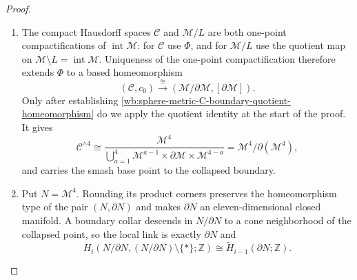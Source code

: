 \begin{proof}
\begin{enumerate}[label=\arabic*.,leftmargin=*]
\item The compact Hausdorff spaces \(\mathcal C\) and
\(\mathcal M/L\) are both one-point compactifications of
\(\operatorname{int}\mathcal M\): for \(\mathcal C\) use \(\Phi\), and for
\(\mathcal M/L\) use the quotient map on
\(\mathcal M\setminus L=\operatorname{int}\mathcal M\).  Uniqueness of the
one-point compactification therefore extends \(\Phi\) to a based
homeomorphism
\begin{equation}
 (\mathcal C,c_0)
 \xrightarrow{\ \cong\ }
 (\mathcal M/\partial\mathcal M,[\partial\mathcal M]).
 \label{wb:sphere-metric-C-boundary-quotient-homeomorphism}
\end{equation}
Only after establishing
\eqref{wb:sphere-metric-C-boundary-quotient-homeomorphism} do we apply the
quotient identity at the start of the proof.  It gives
\[
 \mathcal C^{\wedge4}
 \cong
 \frac{\mathcal M^4}
 {\displaystyle\bigcup_{a=1}^4
  \mathcal M^{a-1}\times\partial\mathcal M
  \times\mathcal M^{4-a}}
 =\mathcal M^4/\partial(\mathcal M^4),
\]
and carries the smash base point to the collapsed boundary.

\item Put \(N=\mathcal M^4\).  Rounding its product corners preserves the
homeomorphism type of the pair \((N,\partial N)\) and makes
\(\partial N\) an eleven-dimensional closed manifold.  A boundary collar
descends in \(N/\partial N\) to a cone neighborhood of the collapsed
point, so the local link is exactly \(\partial N\) and
\begin{equation}
 H_i(N/\partial N,(N/\partial N)\setminus\{*\};\mathbb Z)
 \cong\widetilde H_{i-1}(\partial N;\mathbb Z).
 \label{wb:sphere-metric-boundary-link-local-shift}
\end{equation}


\end{enumerate}
\end{proof}
